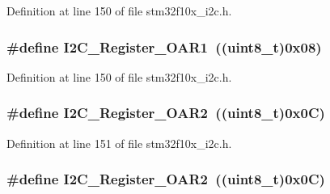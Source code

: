 Definition at line 150 of file stm32f10x\+\_\+i2c.\+h.

\subsubsection[{\texorpdfstring{I2\+C\+\_\+\+Register\+\_\+\+O\+A\+R1}{I2C_Register_OAR1}}]{\setlength{\rightskip}{0pt plus 5cm}\#define I2\+C\+\_\+\+Register\+\_\+\+O\+A\+R1~(({\bf uint8\+\_\+t})0x08)}\hypertarget{group___i2_c__registers_ga706317a00c0d450e95c00efd2afe1836}{}\label{group___i2_c__registers_ga706317a00c0d450e95c00efd2afe1836}


Definition at line 150 of file stm32f10x\+\_\+i2c.\+h.

\subsubsection[{\texorpdfstring{I2\+C\+\_\+\+Register\+\_\+\+O\+A\+R2}{I2C_Register_OAR2}}]{\setlength{\rightskip}{0pt plus 5cm}\#define I2\+C\+\_\+\+Register\+\_\+\+O\+A\+R2~(({\bf uint8\+\_\+t})0x0\+C)}\hypertarget{group___i2_c__registers_gaffdc1902493456dea95216a39fc54e2b}{}\label{group___i2_c__registers_gaffdc1902493456dea95216a39fc54e2b}


Definition at line 151 of file stm32f10x\+\_\+i2c.\+h.

\subsubsection[{\texorpdfstring{I2\+C\+\_\+\+Register\+\_\+\+O\+A\+R2}{I2C_Register_OAR2}}]{\setlength{\rightskip}{0pt plus 5cm}\#define I2\+C\+\_\+\+Register\+\_\+\+O\+A\+R2~(({\bf uint8\+\_\+t})0x0\+C)}\hypertarget{group___i2_c__registers_gaffdc1902493456dea95216a39fc54e2b}{}\label{group___i2_c__registers_gaffdc1902493456dea95216a39fc54e2b}


